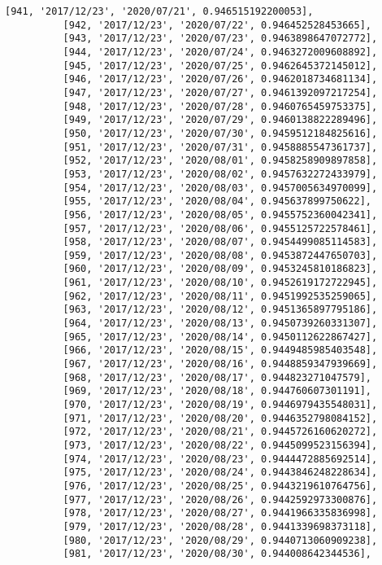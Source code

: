 \documentclass[11pt]{article}
\begin{document}
\begin{Verbatim}[commandchars=\\\{\}]
          [941, '2017/12/23', '2020/07/21', 0.946515192200053],
          [942, '2017/12/23', '2020/07/22', 0.946452528453665],
          [943, '2017/12/23', '2020/07/23', 0.9463898647072772],
          [944, '2017/12/23', '2020/07/24', 0.9463272009608892],
          [945, '2017/12/23', '2020/07/25', 0.9462645372145012],
          [946, '2017/12/23', '2020/07/26', 0.9462018734681134],
          [947, '2017/12/23', '2020/07/27', 0.9461392097217254],
          [948, '2017/12/23', '2020/07/28', 0.9460765459753375],
          [949, '2017/12/23', '2020/07/29', 0.9460138822289496],
          [950, '2017/12/23', '2020/07/30', 0.9459512184825616],
          [951, '2017/12/23', '2020/07/31', 0.9458885547361737],
          [952, '2017/12/23', '2020/08/01', 0.9458258909897858],
          [953, '2017/12/23', '2020/08/02', 0.9457632272433979],
          [954, '2017/12/23', '2020/08/03', 0.9457005634970099],
          [955, '2017/12/23', '2020/08/04', 0.945637899750622],
          [956, '2017/12/23', '2020/08/05', 0.9455752360042341],
          [957, '2017/12/23', '2020/08/06', 0.9455125722578461],
          [958, '2017/12/23', '2020/08/07', 0.9454499085114583],
          [959, '2017/12/23', '2020/08/08', 0.9453872447650703],
          [960, '2017/12/23', '2020/08/09', 0.9453245810186823],
          [961, '2017/12/23', '2020/08/10', 0.9452619172722945],
          [962, '2017/12/23', '2020/08/11', 0.9451992535259065],
          [963, '2017/12/23', '2020/08/12', 0.9451365897795186],
          [964, '2017/12/23', '2020/08/13', 0.9450739260331307],
          [965, '2017/12/23', '2020/08/14', 0.9450112622867427],
          [966, '2017/12/23', '2020/08/15', 0.9449485985403548],
          [967, '2017/12/23', '2020/08/16', 0.9448859347939669],
          [968, '2017/12/23', '2020/08/17', 0.944823271047579],
          [969, '2017/12/23', '2020/08/18', 0.944760607301191],
          [970, '2017/12/23', '2020/08/19', 0.9446979435548031],
          [971, '2017/12/23', '2020/08/20', 0.9446352798084152],
          [972, '2017/12/23', '2020/08/21', 0.9445726160620272],
          [973, '2017/12/23', '2020/08/22', 0.9445099523156394],
          [974, '2017/12/23', '2020/08/23', 0.9444472885692514],
          [975, '2017/12/23', '2020/08/24', 0.9443846248228634],
          [976, '2017/12/23', '2020/08/25', 0.9443219610764756],
          [977, '2017/12/23', '2020/08/26', 0.9442592973300876],
          [978, '2017/12/23', '2020/08/27', 0.9441966335836998],
          [979, '2017/12/23', '2020/08/28', 0.9441339698373118],
          [980, '2017/12/23', '2020/08/29', 0.9440713060909238],
          [981, '2017/12/23', '2020/08/30', 0.944008642344536],

\end{Verbatim}
\end{document}
